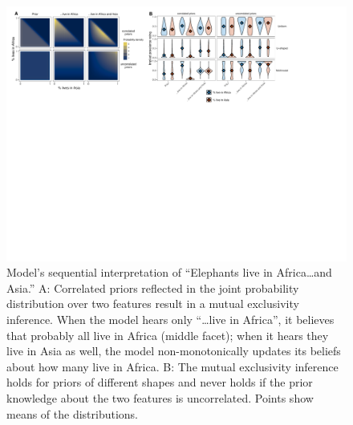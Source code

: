 \documentclass[10pt,letterpaper]{article}
\begin{document}
\begin{figure}[t]
  \centering
    \includegraphics[width=1\textwidth]{model}
    \vspace{-0.7cm}
  \caption{Model's sequential interpretation of ``Elephants live in Africa\ldots and Asia.'' A: Correlated priors reflected in the joint probability distribution over two features result in a mutual exclusivity inference. When the model hears only ``\ldots live in Africa'', it believes that probably all live in Africa (middle facet); when it hears they live in Asia as well, the model non-monotonically updates its beliefs about how many live in Africa. B: The mutual exclusivity inference holds for priors of different shapes and never holds if the prior knowledge about the two features is uncorrelated. Points show means of the distributions.}
  \label{fig:model}
          \vspace{-0.5cm}
\end{figure}
\end{document}
